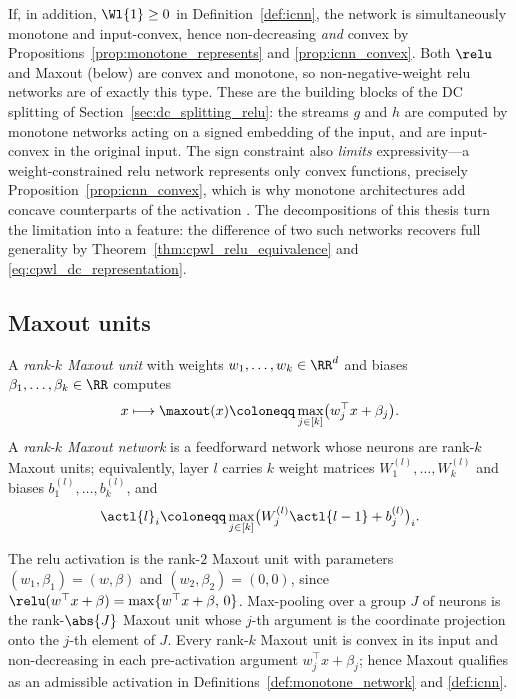 \begin{remark}\label{rem:monotone_convex_combined}
If, in addition, $\Wl{1} \ge 0$ in Definition~\ref{def:icnn}, the network is simultaneously monotone and input-convex, hence non-decreasing \emph{and} convex by Propositions~\ref{prop:monotone_represents} and \ref{prop:icnn_convex}. Both $\relu$ and Maxout (below) are convex and monotone, so non-negative-weight \ac{relu} networks are of exactly this type. These are the building blocks of the DC splitting of Section~\ref{sec:dc_splitting_relu}: the streams $g$ and $h$ are computed by monotone networks acting on a signed embedding of the input, and are input-convex in the original input. The sign constraint also \emph{limits} expressivity---a weight-constrained \ac{relu} network represents only convex functions, precisely Proposition~\ref{prop:icnn_convex}, which is why monotone architectures add concave counterparts of the activation \cite{Runje_2023}. The decompositions of this thesis turn the limitation into a feature: the difference of two such networks recovers full generality by Theorem~\ref{thm:cpwl_relu_equivalence} and \eqref{eq:cpwl_dc_representation}.
\end{remark}

\subsection*{Maxout units}

\begin{definition}\label{def:maxout}
A \emph{rank-$k$ Maxout unit} with weights $w_1, \ldots, w_k \in \RR^{d}$ and biases $\beta_1, \ldots, \beta_k \in \RR$ computes
\begin{equation}
	x \longmapsto \maxout(x) \coloneqq \max_{j \in [k]} \bigl( w_j^{\top} x + \beta_j \bigr).
	\label{eq:maxout_unit}
\end{equation}
A \emph{rank-$k$ Maxout network} is a feedforward network whose neurons are rank-$k$ Maxout units; equivalently, layer $l$ carries $k$ weight matrices $W^{(l)}_1, \ldots, W^{(l)}_k$ and biases $b^{(l)}_1, \ldots, b^{(l)}_k$, and
\begin{equation}
	\actl{l}_i \coloneqq \max_{j \in [k]} \bigl( W^{(l)}_j \actl{l-1} + b^{(l)}_j \bigr)_i .
	\label{eq:maxout_layer}
\end{equation}
\end{definition}

\begin{observation}\label{obs:relu_maxout_special_case}
The \ac{relu} activation is the rank-$2$ Maxout unit with parameters $(w_1, \beta_1) = (w, \beta)$ and $(w_2, \beta_2) = (0, 0)$, since $\relu(w^\top x + \beta) = \max\{w^\top x + \beta,\, 0\}$. Max-pooling over a group $J$ of neurons is the rank-$\abs{J}$ Maxout unit whose $j$-th argument is the coordinate projection onto the $j$-th element of $J$. Every rank-$k$ Maxout unit is convex in its input and non-decreasing in each pre-activation argument $w_j^\top x + \beta_j$; hence Maxout qualifies as an admissible activation in Definitions~\ref{def:monotone_network} and \ref{def:icnn}.
\end{observation}

